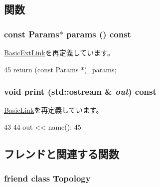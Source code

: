 \subsection{関数}
\hypertarget{classSimpleExtLink_acd3c3feb78ae7a8f88fe0f110a718dff}{
\subsubsection[{params}]{\setlength{\rightskip}{0pt plus 5cm}const {\bf Params}$\ast$ params () const}}
\label{classSimpleExtLink_acd3c3feb78ae7a8f88fe0f110a718dff}


\hyperlink{classBasicExtLink_acd3c3feb78ae7a8f88fe0f110a718dff}{BasicExtLink}を再定義しています。


\begin{DoxyCode}
45 { return (const Params *)_params; }
\end{DoxyCode}
\hypertarget{classSimpleExtLink_ac55fe386a101fbae38c716067c9966a0}{
\subsubsection[{print}]{\setlength{\rightskip}{0pt plus 5cm}void print (std::ostream \& {\em out}) const}}
\label{classSimpleExtLink_ac55fe386a101fbae38c716067c9966a0}


\hyperlink{classBasicLink_ac55fe386a101fbae38c716067c9966a0}{BasicLink}を再定義しています。


\begin{DoxyCode}
43 {
44     out << name();
45 }
\end{DoxyCode}


\subsection{フレンドと関連する関数}
\hypertarget{classSimpleExtLink_acd2b8699ab7559c0da687cd775e2c778}{
\subsubsection[{Topology}]{\setlength{\rightskip}{0pt plus 5cm}friend class {\bf Topology}}}
\label{classSimpleExtLink_acd2b8699ab7559c0da687cd775e2c778}


